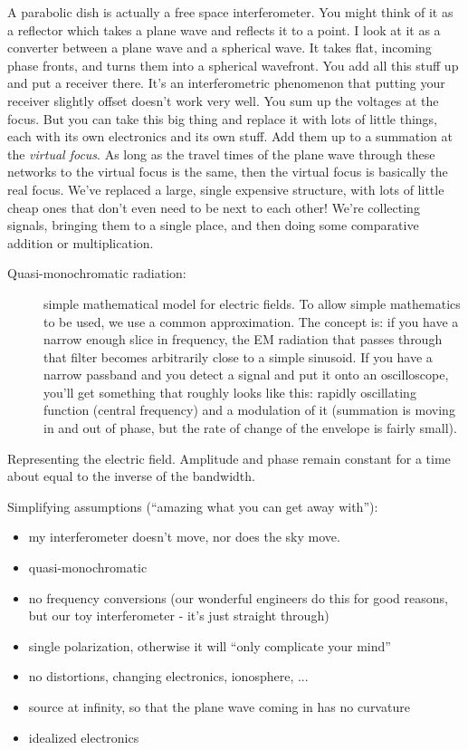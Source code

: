 \documentclass[a4paper]{article}
\begin{document}
A parabolic dish is actually a free space interferometer. You might think of it as a reflector which takes a plane wave and reflects it to a point. I look at it as a converter between a plane wave and a spherical wave. It takes flat, incoming phase fronts, and turns them into a spherical wavefront. You add all this stuff up and put a receiver there. It's an interferometric phenomenon that putting your receiver slightly offset doesn't work very well. You sum up the voltages at the focus. But you can take this big thing and replace it with lots of little things, each with its own electronics and its own stuff. Add them up to a summation at the \emph{virtual focus}. As long as the travel times of the plane wave through these networks to the virtual focus is the same, then the virtual focus is basically the real focus. We've replaced a large, single expensive structure, with lots of little cheap ones that don't even need to be next to each other! We're collecting signals, bringing them to a single place, and then doing some comparative addition or multiplication. 

\begin{description}
\item[Quasi-monochromatic radiation:] simple mathematical model for electric fields. To allow simple mathematics to be used, we use a common approximation. The concept is: if you have a narrow enough slice in frequency, the EM radiation that passes through that filter becomes arbitrarily close to a simple sinusoid. If you have a narrow passband and you detect a signal and put it onto an oscilloscope, you'll get something that roughly looks like this: rapidly oscillating function (central frequency) and a modulation of it (summation is moving in and out of phase, but the rate of change of the envelope is fairly small).
\end{description}

Representing the electric field. Amplitude and phase remain constant for a time about equal to the inverse of the bandwidth. 

Simplifying assumptions (``amazing what you can get away with''): 
\begin{itemize}
\item my interferometer doesn't move, nor does the sky move. 
\item quasi-monochromatic
\item no frequency conversions (our wonderful engineers do this for good reasons, but our toy interferometer - it's just straight through)
\item single polarization, otherwise it will ``only complicate your mind''
\item no distortions, changing electronics, ionosphere, ...
\item source at infinity, so that the plane wave coming in has no curvature
\item idealized electronics
\end{itemize}
\end{document}
